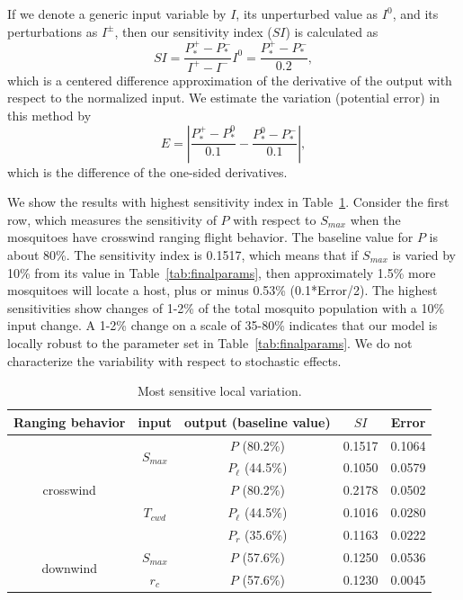 \documentclass[12pt]{article}
\newcommand{\mycaption}[1]{\caption{#1}}
\begin{document}
If we denote a generic input variable by $I$, its unperturbed value as $I^0$, and its perturbations as $I^\pm$, then our sensitivity index ($SI$) is calculated as
\begin{equation*}
	SI = \frac{P_*^+ - P_*^-}{I^+ - I^-}I^0 = \frac{P_*^+ - P_*^-}{0.2},
\end{equation*}
which is a centered difference approximation of the derivative of the output with respect to the normalized input. We estimate the variation (potential error) in this method by
\begin{equation*}
	E = \left|\frac{P_*^+ - P_*^0}{0.1} - \frac{P_*^0 - P_*^-}{0.1} \right|,
\end{equation*}
which is the difference of the one-sided derivatives.

We show the results with highest sensitivity index in Table~\ref{tab:sensitivity}. Consider the first row, which measures the sensitivity of $P$ with respect to $S_{max}$ when the mosquitoes have crosswind ranging flight behavior. The baseline value for $P$ is about 80\%. The sensitivity index is 0.1517, which means that if $S_{max}$ is varied by 10\% from its value in Table~\ref{tab:finalparams},
then approximately 1.5\% more mosquitoes will locate a host, plus or minus 0.53\% (0.1*Error/2). The highest sensitivities show changes of 1-2\% of the total mosquito population with a 10\% input change. A 1-2\% change on a scale of 35-80\% indicates that our model is locally robust to the parameter set in Table~\ref{tab:finalparams}. We do not characterize the variability with respect to stochastic effects.

\begin{table}[hbtp]
	\mycaption{Most sensitive local variation.}
	\begin{center}
		\begin{tabular}{|c|c|c|c|c|}
			\hline
			Ranging behavior & input & output (baseline value)& $SI$ & Error \\
			\hline
			\multirow{5}{*}{crosswind} & \multirow{2}{*}{$S_{max}$} & $P$ (80.2\%) & 0.1517 & 0.1064 \\
										& 						  & $P_\ell$ (44.5\%)	& 0.1050 & 0.0579 \\
										\cline{2-5}
										 & \multirow{3}{*}{$T_{cwd}$} & $P$ (80.2\%) & 0.2178 & 0.0502 \\
										& 						  & $P_\ell$	(44.5\%) & 0.1016 & 0.0280 \\
										& 						  & $P_r$ (35.6\%)	& 0.1163 & 0.0222 \\
			\hline
			\multirow{2}{*}{downwind} & $S_{max}$ & $P$ (57.6\%) & 0.1250 & 0.0536 \\
										 & $r_c$ & $P$ (57.6\%) & 0.1230 & 0.0045  \\
			\hline
		\end{tabular}
	\end{center}\label{tab:sensitivity}
\end{table}
\end{document}
